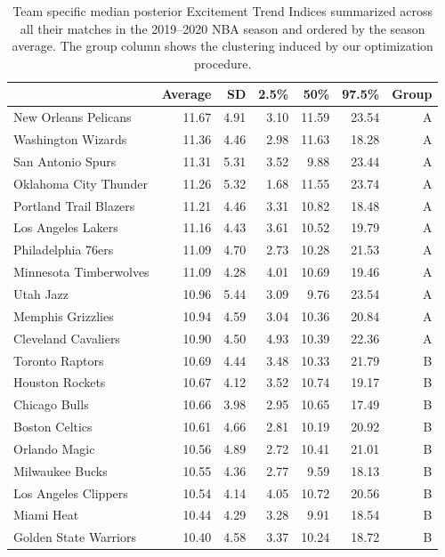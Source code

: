 \documentclass[
  11pt,
]{svjour3}
\theoremstyle{nonumberplain}
\begin{document}
\begin{table}

\caption{\label{tab:unnamed-chunk-1}Team specific median posterior Excitement Trend Indices summarized across all their matches in the 2019--2020 NBA season and ordered by the season average. The group column shows the clustering induced by our optimization procedure.\label{tab:teamsummary}}
\centering
\begin{tabular}[t]{lrr|rrr|r}
\toprule
  & Average & SD & 2.5\% & 50\% & 97.5\% & Group\\
\midrule
New Orleans Pelicans & 11.67 & 4.91 & 3.10 & 11.59 & 23.54 & A\\
Washington Wizards & 11.36 & 4.46 & 2.98 & 11.63 & 18.28 & A\\
San Antonio Spurs & 11.31 & 5.31 & 3.52 & 9.88 & 23.44 & A\\
Oklahoma City Thunder & 11.26 & 5.32 & 1.68 & 11.55 & 23.74 & A\\
Portland Trail Blazers & 11.21 & 4.46 & 3.31 & 10.82 & 18.48 & A\\
Los Angeles Lakers & 11.16 & 4.43 & 3.61 & 10.52 & 19.79 & A\\
Philadelphia 76ers & 11.09 & 4.70 & 2.73 & 10.28 & 21.53 & A\\
Minnesota Timberwolves & 11.09 & 4.28 & 4.01 & 10.69 & 19.46 & A\\
Utah Jazz & 10.96 & 5.44 & 3.09 & 9.76 & 23.54 & A\\
Memphis Grizzlies & 10.94 & 4.59 & 3.04 & 10.36 & 20.84 & A\\
Cleveland Cavaliers & 10.90 & 4.50 & 4.93 & 10.39 & 22.36 & A\\
\hline
Toronto Raptors & 10.69 & 4.44 & 3.48 & 10.33 & 21.79 & B\\
Houston Rockets & 10.67 & 4.12 & 3.52 & 10.74 & 19.17 & B\\
Chicago Bulls & 10.66 & 3.98 & 2.95 & 10.65 & 17.49 & B\\
Boston Celtics & 10.61 & 4.66 & 2.81 & 10.19 & 20.92 & B\\
Orlando Magic & 10.56 & 4.89 & 2.72 & 10.41 & 21.01 & B\\
Milwaukee Bucks & 10.55 & 4.36 & 2.77 & 9.59 & 18.13 & B\\
Los Angeles Clippers & 10.54 & 4.14 & 4.05 & 10.72 & 20.56 & B\\
Miami Heat & 10.44 & 4.29 & 3.28 & 9.91 & 18.54 & B\\
Golden State Warriors & 10.40 & 4.58 & 3.37 & 10.24 & 18.72 & B\\

\end{tabular}
\end{table}
\end{document}
